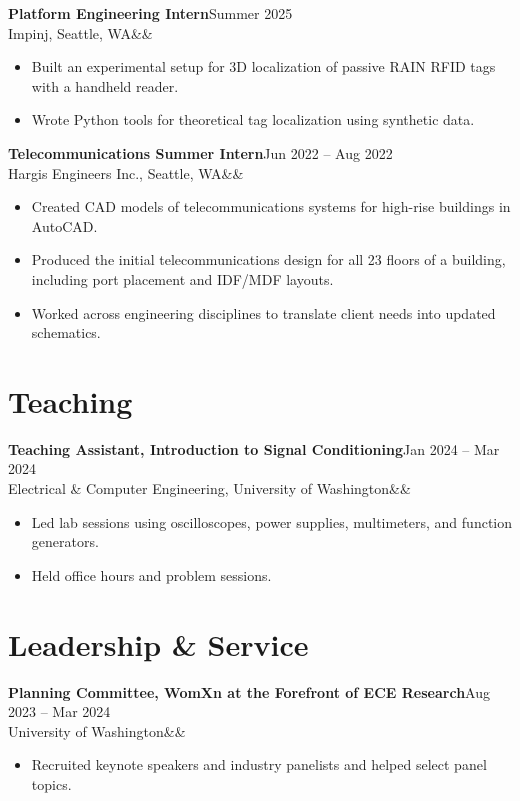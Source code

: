 \documentclass[11pt,letterpaper]{article}
\newcommand{\cventry}[4]{%
  \textbf{#1}\hfill #2\\
  #3\ifx&#4&\else\\ \textit{#4}\fi\par\vspace{2pt}}
\begin{document}
\cventry{Platform Engineering Intern}{Summer 2025}
        {Impinj, Seattle, WA}{}
\begin{itemize}
  \item Built an experimental setup for 3D localization of passive RAIN RFID tags with a handheld reader.
  \item Wrote Python tools for theoretical tag localization using synthetic data.
\end{itemize}

\cventry{Telecommunications Summer Intern}{Jun 2022 -- Aug 2022}
        {Hargis Engineers Inc., Seattle, WA}{}
\begin{itemize}
  \item Created CAD models of telecommunications systems for high-rise buildings in AutoCAD.
  \item Produced the initial telecommunications design for all 23 floors of a building, including port placement and IDF/MDF layouts.
  \item Worked across engineering disciplines to translate client needs into updated schematics.
\end{itemize}

\section{Teaching}
\cventry{Teaching Assistant, Introduction to Signal Conditioning}{Jan 2024 -- Mar 2024}
        {Electrical \& Computer Engineering, University of Washington}{}
\begin{itemize}
  \item Led lab sessions using oscilloscopes, power supplies, multimeters, and function generators.
  \item Held office hours and problem sessions.
\end{itemize}

\section{Leadership \& Service}
\cventry{Planning Committee, WomXn at the Forefront of ECE Research}{Aug 2023 -- Mar 2024}
        {University of Washington}{}
\begin{itemize}
  \item Recruited keynote speakers and industry panelists and helped select panel topics.
\end{itemize}
\end{document}

